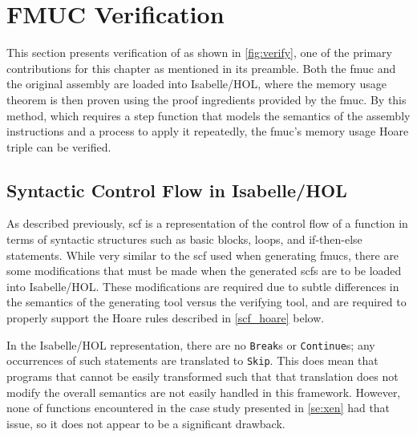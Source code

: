 \section{FMUC Verification}\label{se:fmuc_ver}
This section presents verification of  as shown in \cref{fig:verify},
one of the primary contributions for this chapter as mentioned in its preamble.
Both the \ac{fmuc} and the original assembly are loaded into Isabelle/HOL,
where the memory usage theorem is then proven using the proof ingredients
provided by the \ac{fmuc}.
By this method, which requires a step function
that models the semantics of the assembly instructions
and a process to apply it repeatedly,
the \ac{fmuc}'s memory usage Hoare triple can be verified.

\begin{figure*}
  \centering
  \caption{Overview of \acs*{fmuc} verification}\label{fig:verify}
\end{figure*}

\subsection{Syntactic Control Flow in Isabelle/HOL}\label{isabelle_scf}
As described previously, \acl{scf} is a representation of the control flow of a function
in terms of syntactic structures such as basic blocks,
loops, and if-then-else statements.
While very similar to the \ac{scf} used when generating \acp{fmuc},
there are some modifications that must be made when the generated \acp{scf}
are to be loaded into Isabelle/HOL.
These modifications are required due to subtle differences in the semantics
of the generating tool versus the verifying tool,
and are required to properly support the Hoare rules
described in \cref{scf_hoare} below.

In the Isabelle/HOL representation,
there are no \texttt{Break}s or \texttt{Continue}s;
any occurrences of such statements are translated to \texttt{Skip}.
This does mean that programs that cannot be easily transformed
such that that translation does not modify the overall semantics
are not easily handled in this framework.
However, none of functions encountered in the case study presented in \cref{se:xen}
had that issue, so it does not appear to be a significant drawback.

